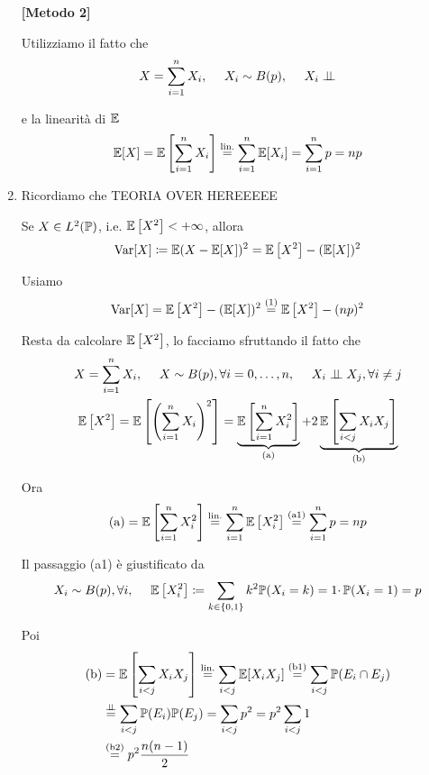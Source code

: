 \begin{enumerate}
\textbf{[Metodo 2]}

Utilizziamo il fatto che
\begin{equation*}
X=\sum\limits _{i=1}^{n} X_{i} ,\ \ \ \ X_{i} \sim B( p) ,\ \ \ \ X_{i} \perp \!\!\! \perp 
\end{equation*}

e la linearità di $\mathbb{E}$\begin{equation*}
\mathbb{E}[ X] =\mathbb{E}\left[\sum\limits _{i=1}^{n} X_{i}\right]\overset{\text{lin.}}{=}\sum\limits _{i=1}^{n}\mathbb{E}[ X_{i}] =\sum\limits _{i=1}^{n} p=np
\end{equation*}
\item Ricordiamo che TEORIA OVER HEREEEEE

Se $X\in L^{2}(\mathbb{P})$, i.e. $\mathbb{E}\left[ X^{2}\right] < +\infty $, allora
\begin{equation*}
\operatorname{Var}[ X] \coloneqq \mathbb{E}( X-\mathbb{E}[ X])^{2} =\mathbb{E}\left[ X^{2}\right] -(\mathbb{E}[ X])^{2}
\end{equation*}

Usiamo
\begin{equation*}
\operatorname{Var}[ X] =\mathbb{E}\left[ X^{2}\right] -(\mathbb{E}[ X])^{2}\overset{( 1)}{=}\mathbb{E}\left[ X^{2}\right] -( np)^{2}
\end{equation*}

Resta da calcolare $\mathbb{E}\left[ X^{2}\right]$, lo facciamo sfruttando il fatto che
\begin{gather*}
X=\sum\limits _{i=1}^{n} X_{i} ,\ \ \ \ X\sim B( p) ,\forall i=0,\dots ,n,\ \ \ \ X_{i} \perp \!\!\! \perp X_{j} ,\forall i\neq j\\
\mathbb{E}\left[ X^{2}\right] =\mathbb{E}\left[\left(\sum\limits _{i=1}^{n} X_{i}\right)^{2}\right] =\underbrace{\mathbb{E}\left[\sum\limits _{i=1}^{n} X_{i}^{2}\right]}_{\text{(a)}} +2\underbrace{\mathbb{E}\left[\sum\limits _{i< j} X_{i} X_{j}\right]}_{\text{(b)}}
\end{gather*}

Ora
\begin{equation*}
\text{(a)} =\mathbb{E}\left[\sum\limits _{i=1}^{n} X_{i}^{2}\right]\overset{\text{lin.}}{=}\sum\limits _{i=1}^{n}\mathbb{E}\left[ X_{i}^{2}\right]\overset{\text{(a1)}}{=}\sum\limits _{i=1}^{n} p=np
\end{equation*}

Il passaggio (a1) è giustificato da
\begin{equation*}
X_{i} \sim B( p) ,\forall i,\ \ \ \ \mathbb{E}\left[ X_{i}^{2}\right] \coloneqq \sum\limits _{k\in \{0,1\}} k^{2}\mathbb{P}( X_{i} =k) =1\cdotp \mathbb{P}( X_{i} =1) =p
\end{equation*}

Poi
\begin{align*}
\text{(b)} & =\mathbb{E}\left[\sum\limits _{i< j} X_{i} X_{j}\right]\overset{\text{lin.}}{=}\sum\limits _{i< j} \mathbb{E}[ X_{i} X_{j}]\overset{\text{(b1)}}{=}\sum\limits _{i< j}\mathbb{P}( E_{i} \cap E_{j})\\
 & \overset{\perp \!\!\! \perp }{=}\sum\limits _{i< j}\mathbb{P}( E_{i})\mathbb{P}( E_{j}) =\sum\limits _{i< j} p^{2} =p^{2}\sum\limits _{i< j} 1\\
 & \overset{\text{(b2)}}{=} p^{2}\frac{n( n-1)}{2}
\end{align*}


\end{enumerate}
